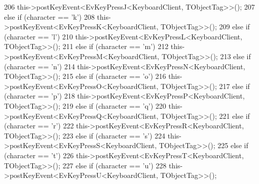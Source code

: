 \begin{DoxyCode}
{206                                 this->postKeyEvent<EvKeyPressJ<KeyboardClient, TObjectTag>>();
207                         \textcolor{keywordflow}{else} \textcolor{keywordflow}{if} (character == \textcolor{charliteral}{'k'})
208                                 this->postKeyEvent<EvKeyPressK<KeyboardClient, TObjectTag>>();
209                         \textcolor{keywordflow}{else} \textcolor{keywordflow}{if} (character == \textcolor{charliteral}{'l'})
210                                 this->postKeyEvent<EvKeyPressL<KeyboardClient, TObjectTag>>();
211                         \textcolor{keywordflow}{else} \textcolor{keywordflow}{if} (character == \textcolor{charliteral}{'m'})
212                                 this->postKeyEvent<EvKeyPressM<KeyboardClient, TObjectTag>>();
213                         \textcolor{keywordflow}{else} \textcolor{keywordflow}{if} (character == \textcolor{charliteral}{'n'})
214                                 this->postKeyEvent<EvKeyPressN<KeyboardClient, TObjectTag>>();
215                         \textcolor{keywordflow}{else} \textcolor{keywordflow}{if} (character == \textcolor{charliteral}{'o'})
216                                 this->postKeyEvent<EvKeyPressO<KeyboardClient, TObjectTag>>();
217                         \textcolor{keywordflow}{else} \textcolor{keywordflow}{if} (character == \textcolor{charliteral}{'p'})
218                                 this->postKeyEvent<EvKeyPressP<KeyboardClient, TObjectTag>>();
219                         \textcolor{keywordflow}{else} \textcolor{keywordflow}{if} (character == \textcolor{charliteral}{'q'})
220                                 this->postKeyEvent<EvKeyPressQ<KeyboardClient, TObjectTag>>();
221                         \textcolor{keywordflow}{else} \textcolor{keywordflow}{if} (character == \textcolor{charliteral}{'r'})
222                                 this->postKeyEvent<EvKeyPressR<KeyboardClient, TObjectTag>>();
223                         \textcolor{keywordflow}{else} \textcolor{keywordflow}{if} (character == \textcolor{charliteral}{'s'})
224                                 this->postKeyEvent<EvKeyPressS<KeyboardClient, TObjectTag>>();
225                         \textcolor{keywordflow}{else} \textcolor{keywordflow}{if} (character == \textcolor{charliteral}{'t'})
226                                 this->postKeyEvent<EvKeyPressT<KeyboardClient, TObjectTag>>();
227                         \textcolor{keywordflow}{else} \textcolor{keywordflow}{if} (character == \textcolor{charliteral}{'u'})
228                                 this->postKeyEvent<EvKeyPressU<KeyboardClient, TObjectTag>>();
}
\end{DoxyCode}
